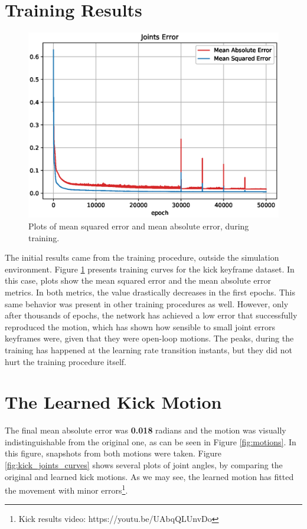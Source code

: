 \section{Training Results}

\begin{figure}[!htbp]
\centering
\includegraphics[width=1\textwidth]{Cap6/errors}
\caption{Plots of mean squared error and mean absolute error, during training.}
\label{fig:errors}
\end{figure}

The initial results came from the training procedure, outside the simulation environment. Figure \ref{fig:errors} presents training curves for the kick keyframe dataset. In this case, plots show the mean squared error and the mean absolute error metrics. In both metrics, the value drastically decreases in the first epochs. This same behavior was present in other training procedures as well. However, only after thousands of epochs, the network has achieved a low error that successfully reproduced the motion, which has shown how sensible to small joint errors keyframes were, given that they were open-loop motions. The peaks, during the training has happened at the learning rate transition instants, but they did not hurt the training procedure itself.

\section{The Learned Kick Motion}

The final mean absolute error was \textbf{0.018} radians and the motion was visually indistinguishable from the original one, as can be seen in Figure \ref{fig:motions}. In this figure, snapshots from both motions were taken. Figure \ref{fig:kick_joints_curves} shows several plots of joint angles, by comparing the original and learned kick motions. As we may see, the learned motion has fitted the movement with minor errors\footnote{\label{footnote_walk} Kick results video: https://youtu.be/UAbqQLUnvDo}.

